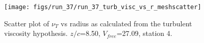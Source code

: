 \begin{figure}[H]
\centering
\texttt{[image: figs/run\_37/run\_37\_turb\_visc\_vs\_r\_meshscatter]}
\caption{Scatter plot of $\nu_T$ vs radius as calculated from the turbulent viscosity hypothesis. $z/c$=8.50, $V_{free}$=27.09, station 4.}
\label{fig:run_37_turb_visc_vs_r_meshscatter}
\end{figure}


